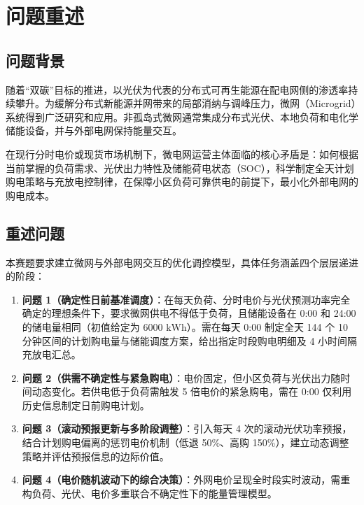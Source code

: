 \documentclass[withoutpreface]{cumcmthesis}
\begin{document}
\section{问题重述}

\subsection{问题背景}
随着“双碳”目标的推进，以光伏为代表的分布式可再生能源在配电网侧的渗透率持续攀升。为缓解分布式新能源并网带来的局部消纳与调峰压力，微网（Microgrid）系统得到广泛研究和应用\cite{bib:zheng,bib:zhou}。非孤岛式微网通常集成分布式光伏、本地负荷和电化学储能设备，并与外部电网保持能量交互。

在现行分时电价或现货市场机制下，微电网运营主体面临的核心矛盾是：如何根据当前掌握的负荷需求、光伏出力特性及储能荷电状态（SOC），科学制定全天计划购电策略与充放电控制律，在保障小区负荷可靠供电的前提下，最小化外部电网的购电成本。

\subsection{重述问题}
本赛题要求建立微网与外部电网交互的优化调控模型，具体任务涵盖四个层层递进的阶段：
\begin{enumerate}
    \item \textbf{问题 1（确定性日前基准调度）}：在每天负荷、分时电价与光伏预测功率完全确定的理想条件下，要求微网供电不得低于负荷，且储能设备在 0:00 和 24:00 的储电量相同（初值给定为 $6000\text{ kWh}$）。需在每天 0:00 制定全天 144 个 10 分钟区间的计划购电量与储能调度方案，给出指定时段购电明细及 4 小时间隔充放电汇总。
    \item \textbf{问题 2（供需不确定性与紧急购电）}：电价固定，但小区负荷与光伏出力随时间动态变化。若供电低于负荷需触发 5 倍电价的紧急购电，需在 0:00 仅利用历史信息制定日前购电计划。
    \item \textbf{问题 3（滚动预报更新与多阶段调整）}：引入每天 4 次的滚动光伏功率预报，结合计划购电偏离的惩罚电价机制（低退 50\%、高购 150\%），建立动态调整策略并评估预报信息的边际价值。
    \item \textbf{问题 4（电价随机波动下的综合决策）}：外网电价呈现全时段实时波动，需重构负荷、光伏、电价多重联合不确定性下的能量管理模型。
\end{enumerate}


\end{document}
